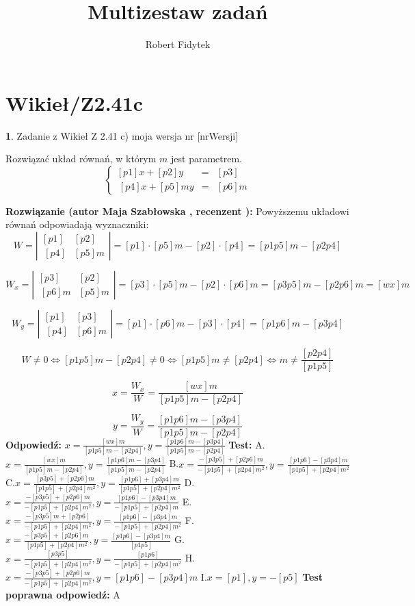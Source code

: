 \documentclass[12pt, a4paper]{article}
\title{Multizestaw zadań}
\author{Robert Fidytek}
\date{}
\theoremstyle{definition} %
\newtheorem{zad}{}
\newcommand{\kategoria}[1]{\section{#1}} %
\newcommand{\zadStart}[1]{\begin{zad}#1\newline} %
\newcommand{\zadStop}{\end{zad}}   %
\newcommand{\rozwStart}[2]{\noindent \textbf{Rozwiązanie (autor #1 , recenzent #2): }\newline} %
\newcommand{\rozwStop}{\newline}                                            %
\newcommand{\odpStart}{\noindent \textbf{Odpowiedź:}\newline}    %
\newcommand{\odpStop}{\newline}                                             %
\newcommand{\testStart}{\noindent \textbf{Test:}\newline} %
\newcommand{\testStop}{\newline} %
\newcommand{\kluczStart}{\noindent \textbf{Test poprawna odpowiedź:}\newline} %
\newcommand{\kluczStop}{\newline} %
\begin{document}
\maketitle


\kategoria{Wikieł/Z2.41c}
\zadStart{Zadanie z Wikieł Z 2.41 c)  moja wersja nr [nrWersji]}

Rozwiązać układ równań, w którym $m$ jest parametrem.
$$\left\{\begin{array}{ccc}
[p1]x+[p2]y&=&[p3]\\
\ [p4]x+[p5]my&=&[p6]m
\end{array} \right.$$

\zadStop
\rozwStart{Maja Szabłowska}{}
Powyższemu układowi równań odpowiadają wyznaczniki:
$$W=\left| \begin{array}{lccr} [p1] & [p2] \\ \ [p4] & [p5]m \end{array}\right| = [p1]\cdot[p5]m - [p2]\cdot[p4]=[p1p5]m-[p2p4]$$

$$W_{x}=\left| \begin{array}{lccr} [p3] & [p2] \\ \ [p6]m & [p5]m \end{array}\right| = [p3]\cdot[p5]m - [p2]\cdot[p6]m=[p3p5]m-[p2p6]m=[wx]m$$

$$W_{y}=\left| \begin{array}{lccr} [p1] & [p3] \\ \ [p4] & [p6]m \end{array}\right| = [p1]\cdot[p6]m - [p3]\cdot[p4]=[p1p6]m-[p3p4]$$

$$W\neq 0 \iff [p1p5]m-[p2p4] \neq 0 \iff [p1p5]m\neq[p2p4] \iff
m\neq \frac{[p2p4]}{[p1p5]} $$

$$x=\frac{W_{x}}{W}=\frac{[wx]m}{[p1p5]m-[p2p4]}$$

$$y=\frac{W_{y}}{W}=\frac{[p1p6]m-[p3p4]}{[p1p5]m-[p2p4]}$$
\rozwStop
\odpStart
$x=\frac{[wx]m}{[p1p5]m-[p2p4]}, y=\frac{[p1p6]m-[p3p4]}{[p1p5]m-[p2p4]}$
\odpStop
\testStart
A.$x=\frac{[wx]m}{[p1p5]m-[p2p4]}, y=\frac{[p1p6]m-[p3p4]}{[p1p5]m-[p2p4]}$
B.$x=\frac{-[p3p5]+[p2p6]m}{-[p1p5]+[p2p4]m^{2}}, y=\frac{[p1p6]-[p3p4]m}{[p1p5]+[p2p4]m^{2}}$
C.$x=\frac{[p3p5]+[p2p6]m}{[p1p5]+[p2p4]m^{2}}, y=\frac{[p1p6]+[p3p4]m}{[p1p5]+[p2p4]m^{2}}$
D.$x=\frac{-[p3p5]+[p2p6]m}{-[p1p5]+[p2p4]m^{2}}, y=\frac{[p1p6]-[p3p4]m}{-[p1p5]+[p2p4]m}$
E.$x=\frac{-[p3p5]m+[p2p6]}{-[p1p5]+[p2p4]m^{2}}, y=\frac{[p1p6]-[p3p4]m}{-[p1p5]+[p2p4]m^{2}}$
F.$x=\frac{-[p3p5]+[p2p6]m}{[p1p5]+[p2p4]m^{2}}, y=\frac{[p1p6]-[p3p4]m}{[p1p5]}$
G.$x=\frac{[p3p5]}{-[p1p5]+[p2p4]m^{2}}, y=\frac{[p1p6]}{-[p1p5]+[p2p4]m^{2}}$
H.$x=\frac{-[p3p5]+[p2p6]m}{-[p1p5]+[p2p4]m^{2}}, y=[p1p6]-[p3p4]m$
I.$x=[p1], y=-[p5]$
\testStop
\kluczStart
A
\kluczStop
\end{document}
